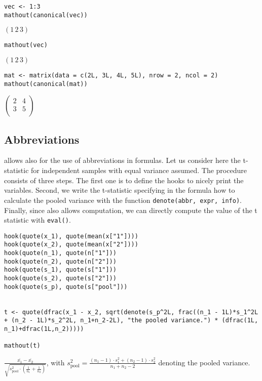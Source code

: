 \begin{verbatim}
vec <- 1:3
mathout(canonical(vec))
\end{verbatim}

\(\left({{1}{\,{2}{\,{3}}}}\right)\)

\begin{verbatim}
mathout(vec)
\end{verbatim}

\(\left({{1}{\,{2}{\,{3}}}}\right)\)

\begin{verbatim}
mat <- matrix(data = c(2L, 3L, 4L, 5L), nrow = 2, ncol = 2)
mathout(canonical(mat))
\end{verbatim}

\(\left(\begin{array}{cc}{2} & {4}\\ {3} & {5}\\ \end{array}\right)\)

\hypertarget{abbreviations}{%
\subsection{Abbreviations}\label{abbreviations}}

 allows also for the use of abbreviations in formulas. Let us consider here the t-statistic for independent samples with equal variance assumed.
The procedure consists of three steps. The first one is to define the hooks to nicely print the variables. Second, we write the t-statistic specifying in the formula how to calculate the pooled variance with the function \texttt{denote(abbr,\ expr,\ info)}. Finally, since  also allows computation, we can directly compute the value of the t statistic with \texttt{eval()}.

\begin{verbatim}
hook(quote(x_1), quote(mean(x["1"])))
hook(quote(x_2), quote(mean(x["2"])))
hook(quote(n_1), quote(n["1"]))
hook(quote(n_2), quote(n["2"]))
hook(quote(s_1), quote(s["1"]))
hook(quote(s_2), quote(s["2"]))
hook(quote(s_p), quote(s["pool"]))


t <- quote(dfrac(x_1 - x_2, sqrt(denote(s_p^2L, frac((n_1 - 1L)*s_1^2L + (n_2 - 1L)*s_2^2L, n_1+n_2-2L), "the pooled variance.") * (dfrac(1L, n_1)+dfrac(1L,n_2)))))
  
mathout(t)
\end{verbatim}

\(\displaystyle{\frac{{\overline{{{x}_\mathrm{1}}}-\overline{{{x}_\mathrm{2}}}}}{\sqrt{{{{s}_\mathrm{pool}^{2}}\cdot\left({\displaystyle{\frac{{1}}{{{n}_\mathrm{1}}}}+\displaystyle{\frac{{1}}{{{n}_\mathrm{2}}}}}\right)}}}}\), with \({{{s}_\mathrm{pool}^{2}}=\frac{{{\left({{{n}_\mathrm{1}}-{1}}\right)\cdot{{s}_\mathrm{1}^{2}}}+{\left({{{n}_\mathrm{2}}-{1}}\right)\cdot{{s}_\mathrm{2}^{2}}}}}{{{{{n}_\mathrm{1}}+{{n}_\mathrm{2}}}-{2}}}}\) denoting the pooled variance.

